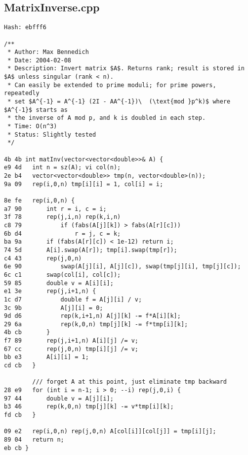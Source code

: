 \documentclass[11pt, a4paper, twoside]{article}
\begin{document}
\subsection{MatrixInverse.cpp}
\begin{lstlisting}
Hash: ebfff6
 
/**
 * Author: Max Bennedich
 * Date: 2004-02-08
 * Description: Invert matrix $A$. Returns rank; result is stored in $A$ unless singular (rank < n).
 * Can easily be extended to prime moduli; for prime powers, repeatedly
 * set $A^{-1} = A^{-1} (2I - AA^{-1})\  (\text{mod }p^k)$ where $A^{-1}$ starts as
 * the inverse of A mod p, and k is doubled in each step.
 * Time: O(n^3)
 * Status: Slightly tested
 */

4b 4b int matInv(vector<vector<double>>& A) {
e9 4d 	int n = sz(A); vi col(n);
2e b4 	vector<vector<double>> tmp(n, vector<double>(n));
9a 09 	rep(i,0,n) tmp[i][i] = 1, col[i] = i;
      
8e fe 	rep(i,0,n) {
a7 90 		int r = i, c = i;
3f 78 		rep(j,i,n) rep(k,i,n)
c8 79 			if (fabs(A[j][k]) > fabs(A[r][c]))
6b d4 				r = j, c = k;
ba 9a 		if (fabs(A[r][c]) < 1e-12) return i;
74 5d 		A[i].swap(A[r]); tmp[i].swap(tmp[r]);
c4 43 		rep(j,0,n)
6e 90 			swap(A[j][i], A[j][c]), swap(tmp[j][i], tmp[j][c]);
6c c1 		swap(col[i], col[c]);
59 85 		double v = A[i][i];
e1 3e 		rep(j,i+1,n) {
1c d7 			double f = A[j][i] / v;
3c 9b 			A[j][i] = 0;
9d d6 			rep(k,i+1,n) A[j][k] -= f*A[i][k];
29 6a 			rep(k,0,n) tmp[j][k] -= f*tmp[i][k];
4b cb 		}
f7 89 		rep(j,i+1,n) A[i][j] /= v;
67 cc 		rep(j,0,n) tmp[i][j] /= v;
bb e3 		A[i][i] = 1;
cd cb 	}
      
      	/// forget A at this point, just eliminate tmp backward
28 e9 	for (int i = n-1; i > 0; --i) rep(j,0,i) {
97 44 		double v = A[j][i];
b3 46 		rep(k,0,n) tmp[j][k] -= v*tmp[i][k];
fd cb 	}
      
09 e2 	rep(i,0,n) rep(j,0,n) A[col[i]][col[j]] = tmp[i][j];
89 04 	return n;
eb cb }
\end{lstlisting}
\end{document}
